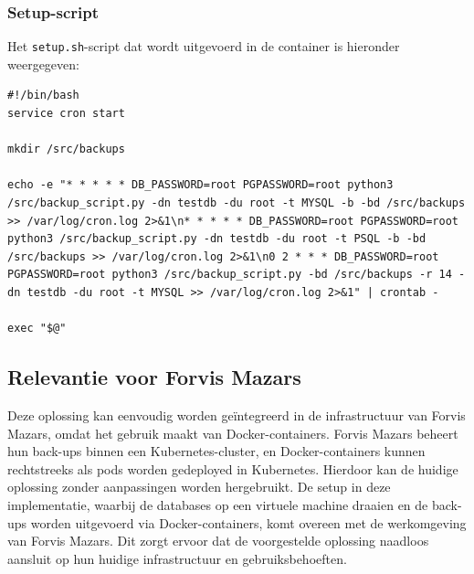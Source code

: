 \subsubsection*{Setup-script}
Het \texttt{setup.sh}-script dat wordt uitgevoerd in de container is hieronder weergegeven:
\begin{lstlisting}[language=script, caption=Setup-script voor het configureren van cronjobs]
#!/bin/bash
service cron start

mkdir /src/backups

echo -e "* * * * * DB_PASSWORD=root PGPASSWORD=root python3 /src/backup_script.py -dn testdb -du root -t MYSQL -b -bd /src/backups >> /var/log/cron.log 2>&1\n* * * * * DB_PASSWORD=root PGPASSWORD=root python3 /src/backup_script.py -dn testdb -du root -t PSQL -b -bd /src/backups >> /var/log/cron.log 2>&1\n0 2 * * * DB_PASSWORD=root PGPASSWORD=root python3 /src/backup_script.py -bd /src/backups -r 14 -dn testdb -du root -t MYSQL >> /var/log/cron.log 2>&1" | crontab -

exec "$@"
\end{lstlisting}

\subsection{Relevantie voor Forvis Mazars}
Deze oplossing kan eenvoudig worden geïntegreerd in de infrastructuur van Forvis Mazars, omdat het gebruik maakt van Docker-containers. Forvis Mazars beheert hun back-ups binnen een Kubernetes-cluster, en Docker-containers kunnen rechtstreeks als pods worden gedeployed in Kubernetes. Hierdoor kan de huidige oplossing zonder aanpassingen worden hergebruikt. De setup in deze implementatie, waarbij de databases op een virtuele machine draaien en de back-ups worden uitgevoerd via Docker-containers, komt overeen met de werkomgeving van Forvis Mazars. Dit zorgt ervoor dat de voorgestelde oplossing naadloos aansluit op hun huidige infrastructuur en gebruiksbehoeften.


































